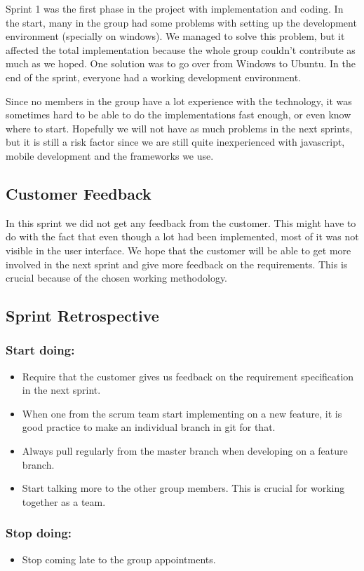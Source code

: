 	Sprint 1 was the first phase in the project with implementation and coding. In the start, 
	many in the group had
	some problems with setting up the development environment (specially on windows). We managed
	to solve this problem, but it affected the total implementation because the whole group couldn't 
	contribute as much as we hoped. One solution was to go over from Windows to Ubuntu. 
	In the end of the sprint, everyone had a working development environment.

	Since no members in the group have a lot experience with the technology, it was sometimes hard
	to be able to do the implementations fast enough, or even know where to start. 
	Hopefully we will not have as much problems in the next sprints, but it is still a risk factor 
	since we are still quite inexperienced with javascript, mobile development and the frameworks we use. 

\subsection{Customer Feedback}
	In this sprint we did not get any feedback from the customer. This might have to do with the 
	fact that even though a lot had been implemented, most of it was not visible in the user interface. 
	We hope that the customer will be able to get more involved in the next sprint and give more feedback 
	on the requirements. This is crucial because of the chosen working methodology.

\subsection{Sprint Retrospective}
	\subsubsection*{Start doing: } 
		\begin{itemize}
			\item Require that the customer gives us feedback on the
			requirement specification in the next sprint.
			\item When one from the scrum team start implementing on a new feature, 
			it is good practice to make an individual branch in git for that. 
			\item Always pull regularly from the master branch when developing
			on a feature branch.
			\item Start talking more to the other group members. This is crucial 
			for working together as a team.
		\end{itemize}
	\subsubsection*{Stop doing: } 
		\begin{itemize}
			\item Stop coming late to the group appointments.
		\end{itemize} 

